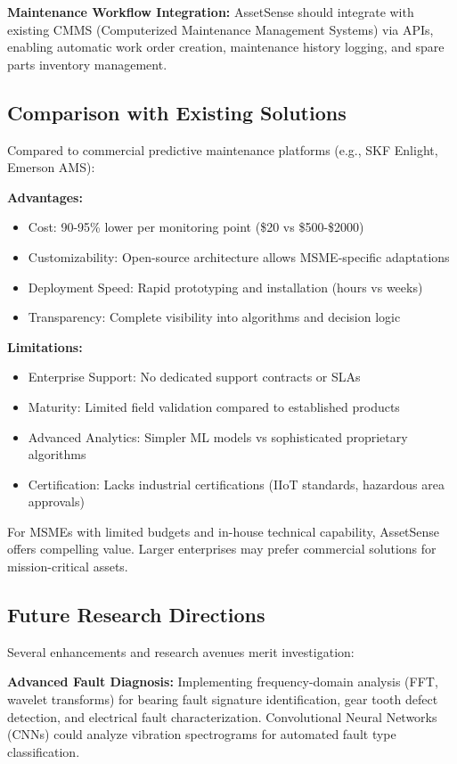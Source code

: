\documentclass[conference]{IEEEtran}
\begin{document}
\textbf{Maintenance Workflow Integration:} AssetSense should integrate with existing CMMS (Computerized Maintenance Management Systems) via APIs, enabling automatic work order creation, maintenance history logging, and spare parts inventory management.

\subsection{Comparison with Existing Solutions}

Compared to commercial predictive maintenance platforms (e.g., SKF Enlight, Emerson AMS):

\textbf{Advantages:}
\begin{itemize}
\item Cost: 90-95\% lower per monitoring point (\$20 vs \$500-\$2000)
\item Customizability: Open-source architecture allows MSME-specific adaptations
\item Deployment Speed: Rapid prototyping and installation (hours vs weeks)
\item Transparency: Complete visibility into algorithms and decision logic
\end{itemize}

\textbf{Limitations:}
\begin{itemize}
\item Enterprise Support: No dedicated support contracts or SLAs
\item Maturity: Limited field validation compared to established products
\item Advanced Analytics: Simpler ML models vs sophisticated proprietary algorithms
\item Certification: Lacks industrial certifications (IIoT standards, hazardous area approvals)
\end{itemize}

For MSMEs with limited budgets and in-house technical capability, AssetSense offers compelling value. Larger enterprises may prefer commercial solutions for mission-critical assets.

\subsection{Future Research Directions}

Several enhancements and research avenues merit investigation:

\textbf{Advanced Fault Diagnosis:} Implementing frequency-domain analysis (FFT, wavelet transforms) for bearing fault signature identification, gear tooth defect detection, and electrical fault characterization. Convolutional Neural Networks (CNNs) could analyze vibration spectrograms for automated fault type classification.
\end{document}
